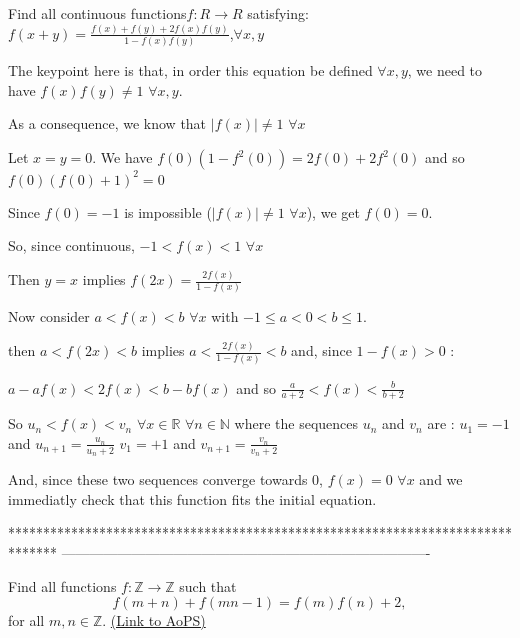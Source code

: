 \begin{solution}
	\begin{tcolorbox}Find all continuous functions$ f: R \to R$
 satisfying:$ f(x + y) = \frac {{f(x) + f(y) + 2f(x)f(y)}} {{1 - f(x)f(y)}}$,$ \forall x,y$\end{tcolorbox}

The keypoint here is that, in order this equation be defined $ \forall x,y$, we need to have $ f(x)f(y)\neq 1$ $ \forall x,y$.

As a consequence, we know that $ |f(x)|\neq 1$ $ \forall x$

Let $ x=y=0$. We have $ f(0)(1-f^2(0))=2f(0)+2f^2(0)$ and so $ f(0)(f(0)+1)^2=0$

Since $ f(0)=-1$ is impossible ($ |f(x)|\neq 1$ $ \forall x$), we get $ f(0)=0$.

So, since continuous, $ -1<f(x)<1$ $ \forall x$ 

Then $ y=x$ implies $ f(2x)=\frac{2f(x)}{1-f(x)}$

Now consider $ a < f(x) < b$ $ \forall x$ with $ -1\leq a < 0 < b\leq 1$.

then $ a < f(2x) < b$ implies $ a < \frac{2f(x)}{1-f(x)} < b$ and, since $ 1 - f(x)>0$ : 


$ a - af(x) < 2f(x) < b - bf(x)$ and so $ \frac{a}{a+2} < f(x) < \frac{b}{b+2}$

So $ u_n < f(x) < v_n$ $ \forall x\in \mathbb R$ $ \forall n\in \mathbb N$ where the sequences $ u_n$ and $ v_n$ are :
$ u_1=-1$ and $ u_{n+1}=\frac{u_n}{u_n+2}$
$ v_1=+1$ and $ v_{n+1}=\frac{v_n}{v_n+2}$

And, since these two sequences converge towards 0, $ f(x)=0$ $ \forall x$ and we immediatly check that this function fits the initial equation.
\end{solution}
*******************************************************************************
-------------------------------------------------------------------------------

\begin{problem}
	Find all functions $ f: \mathbb Z \to \mathbb Z$ such that 
\[f(m + n) + f(mn - 1) = f(m)f(n) + 2 ,\]
for all $m,n \in \mathbb Z$.
	\flushright \href{https://artofproblemsolving.com/community/c6h277444}{(Link to AoPS)}
\end{problem}



